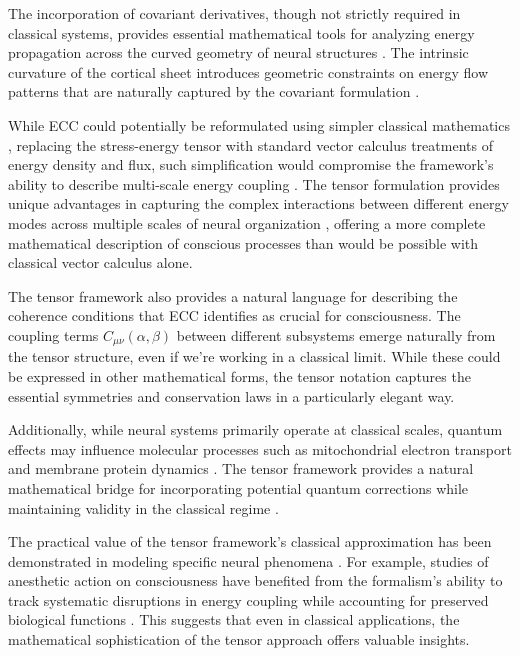 The incorporation of covariant derivatives, though not strictly required in classical systems, provides essential mathematical tools for analyzing energy propagation across the curved geometry of neural structures \cite{rosen2012anticipatory, merleau2012phenomenology}. The intrinsic curvature of the cortical sheet introduces geometric constraints on energy flow patterns that are naturally captured by the covariant formulation \cite{thompson2014waking}.

While ECC could potentially be reformulated using simpler classical mathematics \cite{varela2016embodied}, replacing the stress-energy tensor with standard vector calculus treatments of energy density and flux, such simplification would compromise the framework's ability to describe multi-scale energy coupling \cite{koch2019feeling}. The tensor formulation provides unique advantages in capturing the complex interactions between different energy modes across multiple scales of neural organization \cite{rovelli2018order}, offering a more complete mathematical description of conscious processes than would be possible with classical vector calculus alone.

The tensor framework also provides a natural language for describing the coherence conditions that ECC identifies as crucial for consciousness. The coupling terms $C_{\mu\nu}(\alpha, \beta)$ between different subsystems emerge naturally from the tensor structure, even if we're working in a classical limit. While these could be expressed in other mathematical forms, the tensor notation captures the essential symmetries and conservation laws in a particularly elegant way.

Additionally, while neural systems primarily operate at classical scales, quantum effects may influence molecular processes such as mitochondrial electron transport and membrane protein dynamics \cite{penrose2016fashion, koch2019feeling}. The tensor framework provides a natural mathematical bridge for incorporating potential quantum corrections while maintaining validity in the classical regime \cite{rosen2012anticipatory}.

The practical value of the tensor framework's classical approximation has been demonstrated in modeling specific neural phenomena \cite{thompson2014waking}. For example, studies of anesthetic action on consciousness have benefited from the formalism's ability to track systematic disruptions in energy coupling while accounting for preserved biological functions \cite{feinberg2016ancient}. This suggests that even in classical applications, the mathematical sophistication of the tensor approach offers valuable insights.

